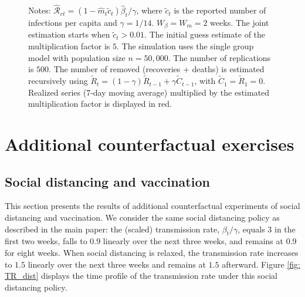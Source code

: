 \documentclass[12pt]{article}
\begin{document}
\begin{figure}[tbh]
\begin{footnotesize}
\begin{center}
\end{center}

%

\vspace{0cm}%
\footnotesize
Notes: $\mathcal{\hat{R}}_{et}=\left(  1-\hat{m}_{t}\tilde{c}_{t}\right)
\hat{\beta}_{t}/\gamma$, where $\tilde{c}_{t}$ is the reported number of
infections per capita and $\gamma=1/14.$ $W_{\beta}=W_{m}=2$ weeks. The joint
estimation starts when $\tilde{c}_{t}>0.01$. The initial guess estimate of the
multiplication factor is $5$. The simulation uses the single group model with
population size $n=50,000$. The number of replications is $500$. The number of
removed (recoveries + deaths) is estimated recursively using $\tilde{R}%
_{t}=\left(  1-\gamma\right)  \tilde{R}_{t-1}+\gamma\tilde{C}_{t-1}$, with
$\tilde{C}_{1}=\tilde{R}_{1}=0$. Realized series (7-day moving average)
multiplied by the estimated multiplication factor is displayed in red.%

\end{footnotesize}%
%

\end{figure}%


\section{Additional counterfactual exercises\label{Sup: counterfactual}}

\subsection{Social distancing and vaccination\label{Sup: vacc}}

This section presents the results of additional counterfactual experiments of
social distancing and vaccination. We consider the same social distancing
policy as described in the main paper: the (scaled) transmission rate,
$\beta_{t}/\gamma$, equals $3$ in the first two weeks, falls to $0.9$ linearly
over the next three weeks, and remains at $0.9$ for eight weeks. When social
distancing is relaxed, the transmission rate increases to $1.5$ linearly over
the next three weeks and remains at $1.5$ afterward. Figure \ref{fig: TR_dist}
displays the time profile of the transmission rate under this social
distancing policy.%
\end{document}
